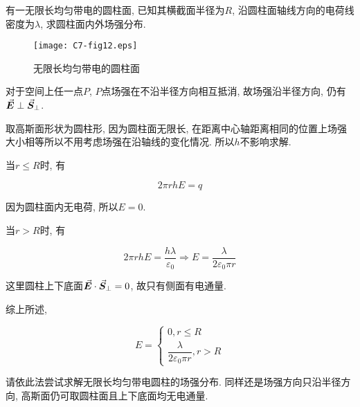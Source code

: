 \begin{example}
	有一无限长均匀带电的圆柱面, 已知其横截面半径为$R$, 沿圆柱面轴线方向的电荷线密度为$\lambda$, 求圆柱面内外场强分布. 
	
	\begin{figure}[h]
		\centering
		\texttt{[image: C7-fig12.eps]}
		\caption{无限长均匀带电的圆柱面}
	\end{figure}
	
	\begin{solution}
		
		对于空间上任一点$P$, $P$点场强在不沿半径方向相互抵消, 故场强沿半径方向, 仍有$\va*{E}\perp \va*{S}_{\bot}$. 
		
		取高斯面形状为圆柱形, 因为圆柱面无限长, 在距离中心轴距离相同的位置上场强大小相等所以不用考虑场强在沿轴线的变化情况. 所以$h$不影响求解. 
		
		当$r \leq R$时, 有
		
		\begin{equation*}
			2 \pi r h E = q
		\end{equation*}
		
		因为圆柱面内无电荷, 所以$E = 0$.
		
		当$r > R$时, 有
		
		\begin{equation*}
			2 \pi r h E = \dfrac{h \lambda}{\varepsilon_0} \Rightarrow E = \dfrac{\lambda}{2 \varepsilon_0 \pi r}
		\end{equation*}
		
		这里圆柱上下底面$\va*{E}\cdot \va*{S}_{\bot} = 0$, 故只有侧面有电通量. 
		
		综上所述, 
		
		\begin{equation*}
			E = \begin{cases}
				0, r \leq R \\
				\dfrac{\lambda}{2 \varepsilon_0 \pi r}, r > R
			\end{cases}
		\end{equation*}
		
	\end{solution}
	
\end{example}

\begin{note}
	
	请依此法尝试求解无限长均匀带电圆柱的场强分布. 同样还是场强方向只沿半径方向, 高斯面仍可取圆柱面且上下底面均无电通量. 
	
\end{note}

